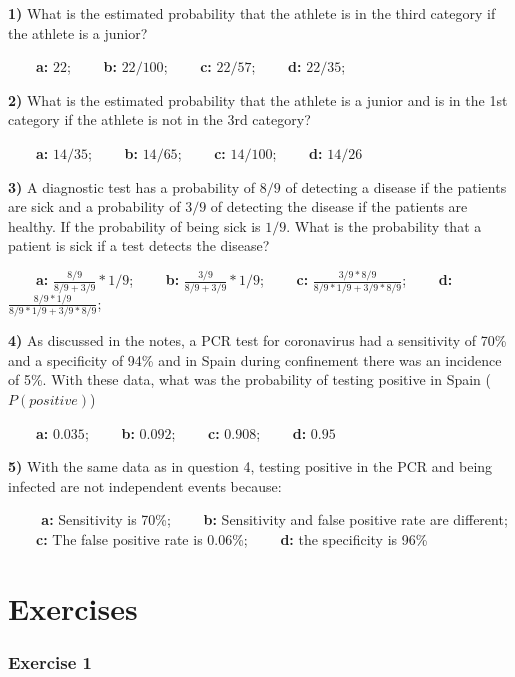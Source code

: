 \documentclass[
]{book}
\begin{document}
\textbf{1)} What is the estimated probability that the athlete is in the third category if the athlete is a junior?

\textbf{\(\qquad\)a:} \(22\); \textbf{\(\qquad\)b:} \(22/100\); \textbf{\(\qquad\)c:} \(22/57\); \textbf{\(\qquad\)d:} \(22/35\);

\textbf{2)} What is the estimated probability that the athlete is a junior and is in the 1st category if the athlete is not in the 3rd category?

\textbf{\(\qquad\)a:} \(14/35\); \textbf{\(\qquad\)b:} \(14/65\); \textbf{\(\qquad\)c:} \(14/100\); \textbf{\(\qquad\)d:} \(14/26\)

\textbf{3)} A diagnostic test has a probability of \(8/9\) of detecting a disease if the patients are sick and a probability of \(3/9\) of detecting the disease if the patients are healthy. If the probability of being sick is \(1/9\). What is the probability that a patient is sick if a test detects the disease?

\textbf{\(\qquad\)a:} \(\frac{8/9}{8/9+3/9}*1/9\);
\textbf{\(\qquad\)b:} \(\frac{3/9}{8/9+3/9}*1/9\);
\textbf{\(\qquad\)c:} \(\frac{3/9*8/9}{8/9*1/9+3/9*8/9}\); \textbf{\(\qquad\)d:} \(\frac{8/9*1/9}{8/9*1/9+3/9*8/9}\);

\textbf{4)} As discussed in the notes, a PCR test for coronavirus had a sensitivity of 70\% and a specificity of 94\% and in Spain during confinement there was an incidence of 5\%. With these data, what was the probability of testing positive in Spain (\(P(positive)\))

\textbf{\(\qquad\)a:} \(0.035\); \textbf{\(\qquad\)b:} \(0.092\); \textbf{\(\qquad\)c:} \(0.908\); \textbf{\(\qquad\)d:} \(0.95\)

\textbf{5)} With the same data as in question 4, testing positive in the PCR and being infected are not independent events because:

\textbf{\(\qquad\) a:} Sensitivity is 70\%;
\textbf{\(\qquad\)b:} Sensitivity and false positive rate are different;
\textbf{\(\qquad\)c:} The false positive rate is 0.06\%; \textbf{\(\qquad\)d:} the specificity is 96\%

\hypertarget{exercises-2}{%
\section{Exercises}\label{exercises-2}}

\hypertarget{exercise-1-1}{%
\subsubsection{Exercise 1}\label{exercise-1-1}}
\end{document}
